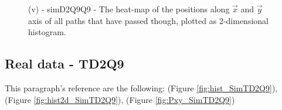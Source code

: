 \documentclass[class=article, crop=false]{standalone}
\begin{document}
\begin{figure}[!htb]
    \centering
        \quad\quad
    \caption{(v) - simD2Q9Q9 - The heat-map of the positions along $\vec x$ and $\vec y$ axis of all paths that have passed though, plotted as 2-dimensional histogram.}
    \label{fig:Pxy_SimD2Q9Q9}
\end{figure}


\FloatBarrier

\subsection{Real data - TD2Q9}
This paragraph's reference are the following: (Figure \ref{fig:hist_SimTD2Q9}), (Figure \ref{fig:hist2d_SimTD2Q9}), (Figure \ref{fig:Pxy_SimTD2Q9}) 
\end{document}
